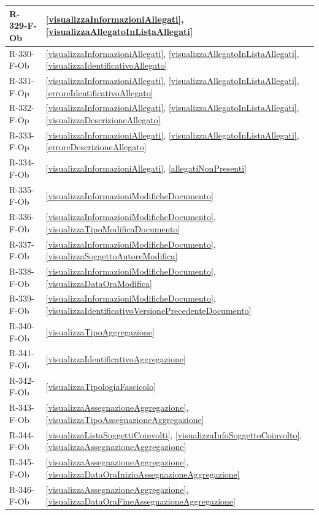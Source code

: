 \begin{longtable}{|p{4cm}|p{10cm}|}
\hline
R-329-F-Ob & \ref{visualizzaInformazioniAllegati}, \ref{visualizzaAllegatoInListaAllegati} \\
\hline
R-330-F-Ob & \ref{visualizzaInformazioniAllegati}, \ref{visualizzaAllegatoInListaAllegati}, \ref{visualizzaIdentificativoAllegato} \\
\hline
R-331-F-Op & \ref{visualizzaInformazioniAllegati}, \ref{visualizzaAllegatoInListaAllegati}, \ref{erroreIdentificativoAllegato} \\
\hline
R-332-F-Op & \ref{visualizzaInformazioniAllegati}, \ref{visualizzaAllegatoInListaAllegati}, \ref{visualizzaDescrizioneAllegato} \\
\hline
R-333-F-Op & \ref{visualizzaInformazioniAllegati}, \ref{visualizzaAllegatoInListaAllegati}, \ref{erroreDescrizioneAllegato} \\
\hline
R-334-F-Ob & \ref{visualizzaInformazioniAllegati}, \ref{allegatiNonPresenti} \\
\hline
R-335-F-Ob & \ref{visualizzaInformazioniModificheDocumento} \\
\hline
R-336-F-Ob & \ref{visualizzaInformazioniModificheDocumento}, \ref{visualizzaTipoModificaDocumento} \\
\hline
R-337-F-Ob & \ref{visualizzaInformazioniModificheDocumento}, \ref{visualizzaSoggettoAutoreModifica} \\
\hline
R-338-F-Ob & \ref{visualizzaInformazioniModificheDocumento}, \ref{visualizzaDataOraModifica} \\
\hline
R-339-F-Ob & \ref{visualizzaInformazioniModificheDocumento}, \ref{visualizzaIdentificativoVersionePrecedenteDocumento} \\
\hline
R-340-F-Ob & \ref{visualizzaTipoAggregazione} \\
\hline
R-341-F-Ob & \ref{visualizzaIdentificativoAggregazione} \\
\hline
R-342-F-Ob & \ref{visualizzaTipologiaFascicolo} \\
\hline
R-343-F-Ob & \ref{visualizzaAssegnazioneAggregazione}, \ref{visualizzaTipoAssegnazioneAggregazione} \\
\hline
R-344-F-Ob & \ref{visualizzaListaSoggettiCoinvolti}, \ref{visualizzaInfoSoggettoCoinvolto}, \ref{visualizzaAssegnazioneAggregazione} \\
\hline
R-345-F-Ob & \ref{visualizzaAssegnazioneAggregazione}, \ref{visualizzaDataOraInizioAssegnazioneAggregazione} \\
\hline
R-346-F-Ob & \ref{visualizzaAssegnazioneAggregazione}, \ref{visualizzaDataOraFineAssegnazioneAggregazione} \\

\end{longtable}
